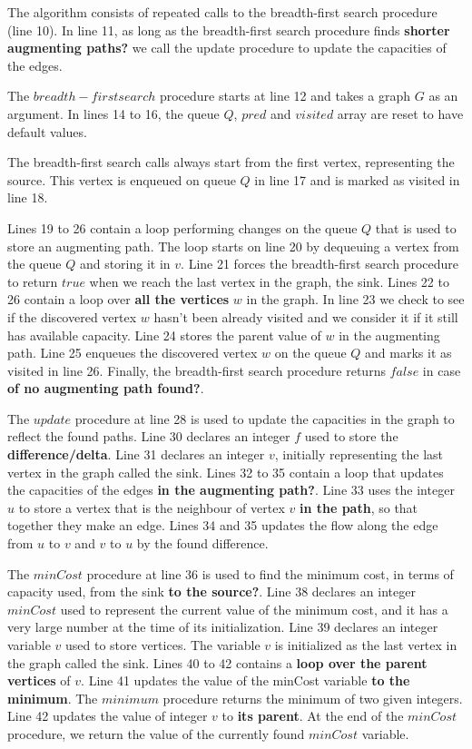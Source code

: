 \documentclass{l4proj}
\begin{document}
\noindent The algorithm consists of repeated calls to the breadth-first search procedure (line 10). In line 11, as long as the breadth-first search procedure finds \textbf{shorter augmenting paths?} we call the update procedure to update the capacities of the edges.

\noindent The $breadth-first search$ procedure starts at line 12 and takes a graph $G$ as an argument. In lines 14 to 16, the queue $Q$, $pred$ and $visited$ array are reset to have default values.

\noindent The breadth-first search calls always start from the first vertex, representing the source. This vertex is enqueued on queue $Q$ in line 17 and is marked as visited in line 18.

\noindent Lines 19 to 26 contain a loop performing changes on the queue $Q$ that is used to store an augmenting path. The loop starts on line 20 by dequeuing a vertex from the queue $Q$ and storing it in $v$. Line 21 forces the breadth-first search procedure to return $true$ when we reach the last vertex in the graph, the sink. Lines 22 to 26 contain a loop over \textbf{all the vertices} $w$ in the graph. In line 23 we check to see if the discovered vertex $w$ hasn't been already visited and we consider it if it still has available capacity. Line 24 stores the parent value of $w$ in the augmenting path. Line 25 enqueues the discovered vertex $w$ on the queue $Q$ and marks it as visited in line 26. Finally, the breadth-first search procedure returns $false$ in case \textbf{of no augmenting path found?}.

\noindent The $update$ procedure at line 28 is used to update the capacities in the graph to reflect the found paths. Line 30 declares an integer $f$ used to store the \textbf{difference/delta}. Line 31 declares an integer $v$, initially representing the last vertex in the graph called the sink. Lines 32 to 35 contain a loop that updates the capacities of the edges \textbf{in the augmenting path?}. Line 33 uses the integer $u$ to store a vertex that is the neighbour of vertex $v$ \textbf{in the path}, so that together they make an edge. Lines 34 and 35 updates the flow along the edge from $u$ to $v$ and $v$ to $u$ by the found difference.

\noindent The $minCost$ procedure at line 36 is used to find the minimum cost, in terms of capacity used, from the sink \textbf{to the source?}. Line 38 declares an integer $minCost$ used to represent the current value of the minimum cost, and it has a very large number at the time of its initialization. Line 39 declares an integer variable $v$ used to store vertices. The variable $v$ is initialized as the last vertex in the graph called the sink. Lines 40 to 42 contains a \textbf{loop over the parent vertices} of $v$. Line 41 updates the value of the minCost variable \textbf{to the minimum}. The $minimum$ procedure returns the minimum of two given integers. Line 42 updates the value of integer $v$ to \textbf{its parent}. At the end of the $minCost$ procedure, we return the value of the currently found $minCost$ variable.
\end{document}
